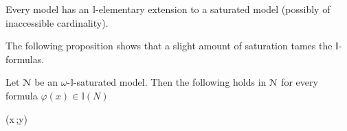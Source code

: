 \documentclass[11pt,oneside]{amsart}
\begin{document}
\begin{theorem}
  Every model has an $\mathds{I}$-elementary extension to a saturated model (possibly of inaccessible cardinality).
\end{theorem}



The following proposition shows that a slight amount of saturation tames the $\mathds{I}$-formulas.


\begin{proposition}\label{prop_approx}
  Let ${\EuScript N}$ be an $\omega$-$\mathds{I}$-saturated model.
  Then the following holds in ${\EuScript N}$ for every formula $\varphi(x)\in\mathds{I}(N)$

  {\leftrightarrow}
  {\varphi(x\,;y)}
\end{proposition}
\end{document}
